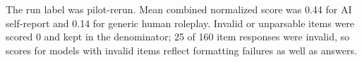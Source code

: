 The run label was pilot-rerun. Mean combined normalized score was 0.44 for AI self-report and 0.14 for generic human roleplay. Invalid or unparsable items were scored 0 and kept in the denominator; 25 of 160 item responses were invalid, so scores for models with invalid items reflect formatting failures as well as answers.
